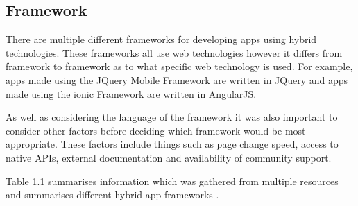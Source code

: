 \subsection{Framework}
There are multiple different frameworks for developing apps using hybrid technologies. These frameworks all use web technologies however it differs from framework to framework as to what specific web technology is used. For example, apps made using the JQuery Mobile Framework are written in JQuery and apps made using the ionic Framework are written in AngularJS.

As well as considering the language of the framework it was also important to consider other factors before deciding which framework would be most appropriate. These factors include things such as page change speed, access to native APIs, external documentation and availability of community support.

Table 1.1 summarises information which was gathered from multiple resources and summarises  different hybrid app frameworks \cite{cordova} \cite{jquerymob} \cite{hab} \cite{cord} \cite{f7} \cite{ionic}.

